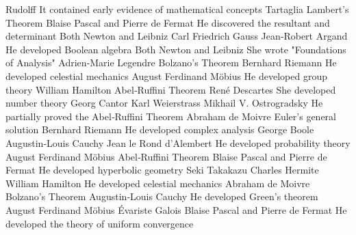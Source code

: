 \answerkey
{} Rudolff
 It contained early evidence of mathematical concepts
 Tartaglia
 Lambert's Theorem
 Blaise Pascal and Pierre de Fermat
 He discovered the resultant and determinant
 Both Newton and Leibniz
 Carl Friedrich Gauss
 Jean‑Robert Argand
 He developed Boolean algebra
 Both Newton and Leibniz
 She wrote "Foundations of Analysis"
 Adrien‑Marie Legendre
 Bolzano's Theorem
 Bernhard Riemann
 He developed celestial mechanics
 August Ferdinand Möbius
 He developed group theory
 William Hamilton
 Abel‑Ruffini Theorem
 René Descartes
 She developed number theory
 Georg Cantor
 Karl Weierstrass
 Mikhail V. Ostrogradsky
 He partially proved the Abel‑Ruffini Theorem
 Abraham de Moivre
 Euler's general solution
 Bernhard Riemann
 He developed complex analysis
 George Boole
 Augustin‑Louis Cauchy
 Jean le Rond d'Alembert
 He developed probability theory
 August Ferdinand Möbius
 Abel‑Ruffini Theorem
 Blaise Pascal and Pierre de Fermat
 He developed hyperbolic geometry
 Seki Takakazu
 Charles Hermite
 William Hamilton
 He developed celestial mechanics
 Abraham de Moivre
 Bolzano's Theorem
 Augustin‑Louis Cauchy
 He developed Green's theorem
 August Ferdinand Möbius
 Évariste Galois
 Blaise Pascal and Pierre de Fermat
 He developed the theory of uniform convergence
\endanswerkey
